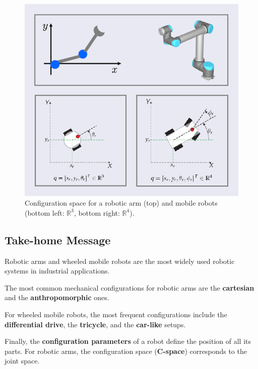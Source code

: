 \begin{figure}[H]
  \centering
  \includegraphics[width=0.9\linewidth]{imgs/configuration_space_examples.png}
  \caption{Configuration space for a robotic arm (top) and mobile robots (bottom left: $\mathbb{R}^3$, bottom right: $\mathbb{R}^4$).}
\end{figure}

\hfill

\subsection{Take-home Message}

Robotic arms and wheeled mobile robots are the most widely used robotic systems in industrial applications.

The most common mechanical configurations for robotic arms are the \textbf{cartesian} and the \textbf{anthropomorphic} ones.

For wheeled mobile robots, the most frequent configurations include the \textbf{differential drive}, the \textbf{tricycle}, and the \textbf{car-like} setups.

Finally, the \textbf{configuration parameters} of a robot define the position of all its parts. For robotic arms, the configuration space (\textbf{C-space}) corresponds to the joint space.

\newpage